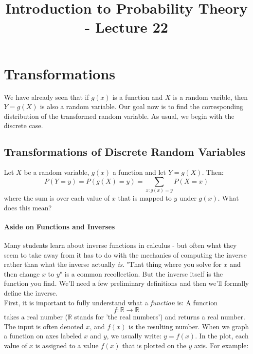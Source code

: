 \documentclass[12pt]{article} %
\date{}
\title{Introduction to Probability Theory - Lecture 22}
\begin{document}
\maketitle

\section{Transformations}
We have already seen that if $g(x)$ is a function and $X$ is a random varible, then $Y= g(X)$ is also a random variable. Our goal now is to find the corresponding distribution of the transformed random variable. As usual, we begin with the discrete case.

\subsection{Transformations of Discrete Random Variables}
Let $X$ be a random variable, $g(x)$ a function and let $Y=g(X)$. Then:
$$P(Y=y) = P(g(X) = y) = \sum_{x:g(x)=y} P(X=x)$$
where the sum is over each value of $x$ that is mapped to $y$ under $g(x)$. What does this mean?
\paragraph{Aside on Functions and Inverses}
Many students learn about inverse functions in calculus - but often what they seem to take away from it has to do with the mechanics of computing the inverse rather than what the inverse actually \emph{is}. "That thing where you solve for $x$ and then change $x$ to $y$" is a common recollection. But the inverse itself is the function you find. We'll need a few preliminary definitions and then we'll formally define the inverse.\\

First, it is important to fully understand what a \emph{function} is: A function
$$f:\mathbb{R}\rightarrow\mathbb{R}$$
takes a real number ($\mathbb{R}$ stands for 'the real numbers') and returns a real number. The input is often denoted $x$, and $f(x)$ is the resulting number. When we graph a function on axes labeled $x$ and $y$, we usually write: $y=f(x)$. In the plot, each value of $x$ is assigned to a value $f(x)$ that is plotted on the $y$ axis. For example:


\end{document}
